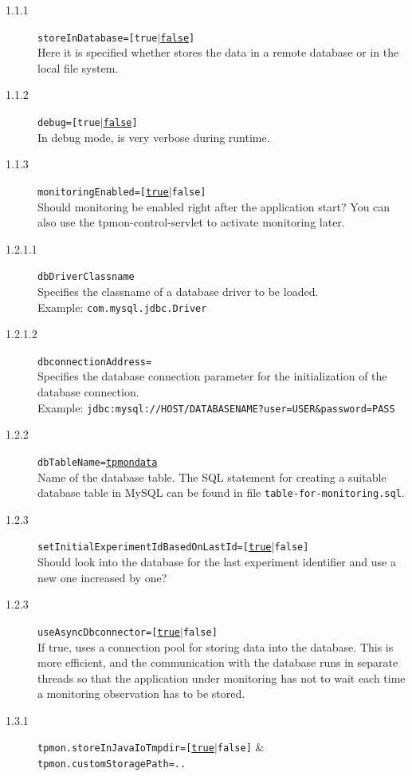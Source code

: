 \documentclass[a4paper,12pt]{scrartcl}
\begin{document}
\begin{description}
 \item [1.1.1] \texttt{storeInDatabase=[true$|$\underline{false}]} \\
Here it is specified whether \tpmon{} stores the data in a remote database or in the local file system.
\item [1.1.2] \texttt{debug=[true$|$\underline{false}]}  \\
In debug mode, \tpmon{} is very verbose during runtime.
\item [1.1.3] \texttt{monitoringEnabled=[\underline{true}$|$false]} \\
Should monitoring be enabled right after the application start? You can also use the tpmon-control-servlet to activate monitoring later.
\item [1.2.1.1] \texttt{dbDriverClassname} \\
Specifies the classname of a database driver to be loaded.\\ Example:
{\small\texttt{com.mysql.jdbc.Driver}}
\item [1.2.1.2] \texttt{dbconnectionAddress=} \\
Specifies the database connection parameter for the initialization of the database connection.\\ Example:
\small
\texttt{jdbc:mysql://HOST/DATABASENAME?user=USER\&password=PASS}
\normalsize
\item [1.2.2] \texttt{dbTableName=\underline{tpmondata}} \\
Name of the database table. The SQL statement for creating a suitable database table in MySQL can be found in file \small \texttt{table-for-monitoring.sql}\normalsize.
\item [1.2.3] \texttt{setInitialExperimentIdBasedOnLastId=[\underline{true}$|$false]} \\
Should \tpmon{} look into the database for the last experiment identifier and use a new one increased by one?
\item [1.2.3] \texttt{useAsyncDbconnector=[\underline{true}$|$false]} \\
If true, \tpmon{} uses a connection pool for storing data into the database. This is more efficient, and the communication with the database runs in separate threads so that the application under monitoring has not to wait each time a monitoring observation has to be stored.
\item [1.3.1] \footnotesize \texttt{tpmon.storeInJavaIoTmpdir=[\underline{true}$|$false]} $\&$ \texttt{tpmon.customStoragePath=..} \normalsize \\

\end{description}
\end{document}
